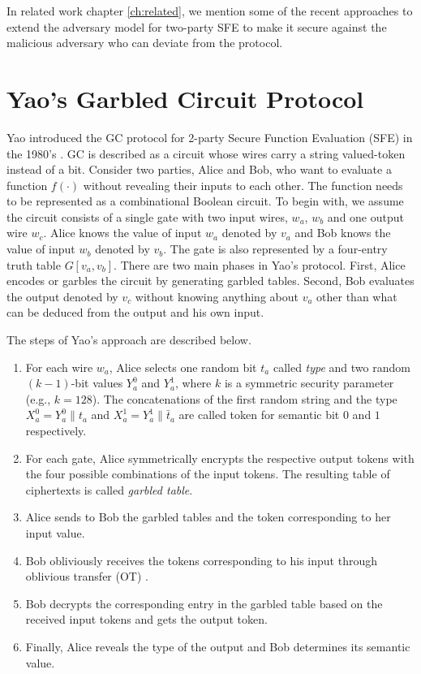 In related work chapter \ref{ch:related}, we mention some of the recent approaches to extend the adversary model for two-party SFE to make it secure against the malicious adversary who can deviate from the protocol.

\section{Yao's Garbled Circuit Protocol}
Yao introduced the GC protocol for 2-party Secure Function Evaluation (SFE) in the 1980's \cite{yao1986generate}.
GC is described as a circuit whose wires carry a string valued-token instead of a bit.
Consider two parties, Alice and Bob, who want to evaluate a function $f(\cdot)$ without revealing their inputs to each other.
The function needs to be represented as a combinational Boolean circuit.
To begin with, we assume the circuit consists of a single gate with two input wires, $w_{a}$, $w_{b}$ and one output wire $w_{c}$.
Alice knows the value of input $w_{a}$ denoted by $v_{a}$ and Bob knows the value of input $w_{b}$ denoted by $v_{b}$.
The gate is also represented by a four-entry truth table $G[v_{a}, v_{b}]$.
There are two main phases in Yao's protocol.
First, Alice encodes or garbles the circuit by generating garbled tables.
Second, Bob evaluates the output denoted by $v_{c}$ without knowing anything about $v_{a}$ other than what can be deduced from the output and his own input.

The steps of Yao's approach are described below.

\begin{enumerate}
\item
	For each wire $w_a$, Alice selects one random bit $t_a$ called \emph{type} and two random $(k-1)$-bit values $Y_a^{0}$ and $Y_a^{1}$, where $k$ is a symmetric security parameter (e.g., $k=128$).
	The concatenations of the first random string and the type $X_a^{0} =  Y_a^{0}\parallel t_a$ and $X_a^{1} =  Y_a^{1}\parallel \bar{t}_a$ are called token for semantic bit $0$ and $1$ respectively.

\item
	For each gate, Alice symmetrically encrypts the respective output tokens with the four possible combinations of the input tokens.
	The resulting table of ciphertexts is called \emph{garbled table}.

\item
	Alice sends to Bob the garbled tables and the token corresponding to her input value.

\item
	Bob obliviously receives the tokens corresponding to his input through oblivious transfer (OT) \cite{rabin2005exchange}.

\item
	Bob decrypts the corresponding entry in the garbled table based on the received input tokens and gets the output token.

\item
	Finally, Alice reveals the type of the output and Bob determines its semantic value.
\end{enumerate}

